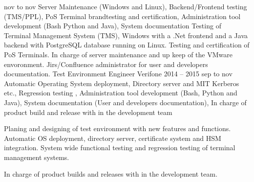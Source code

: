 \documentclass{sobCV}[2017/07/08]
\begin{document}
      {nov to nov}{                           %
      Server Maintenance (Windows and Linux),
      Backend/Frontend testing (TMS/PPL),
      PoS Terminal brandtesting and certification,
      Administration tool development (Bash Python and Java),
      System documentation
      }{
      Testing of Terminal Management System (TMS), Windows with a .Net 
      frontend and a Java backend with PostgreSQL database running on Linux.  
      Testing and certification of PoS Terminals. In charge of server 
      maintenance and up keep of the VMware envoronment. Jirs/Confluence 
      administrator for user and developers documentation.
      }
      \experiencenode
      {Test Environment Engineer}             %
      {Verifone}                              %
      {2014 -- 2015}                          %
      {sep to nov}{                           %
      Automatic Operating System deployment,
      Directory server and MIT Kerberos etc.,
      Regression testing ,
      Administration tool development (Bash, Python and Java),
      System documentation (User and developers documentation),
      In charge of product build and release with in the development team
      }{
      Planing and designing of test environment with new features and 
      functions. Automatic OS deployment, directory server, certificate system 
      and HSM integration. System wide functional testing and regression 
      testing of terminal management systems.

      In charge of product builds and releases with in the development team.
      }
\end{document}

